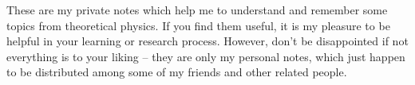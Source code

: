 \documentclass[main.tex]{subfiles}
\begin{document}
   These are my private notes which help me to understand and remember some topics from theoretical physics. If you find them useful, it is my pleasure to be helpful in your learning or research process. However, don't be disappointed if not everything is to your liking -- they are only my personal notes, which just happen to be distributed among some of my friends and other related people.
\end{document}

